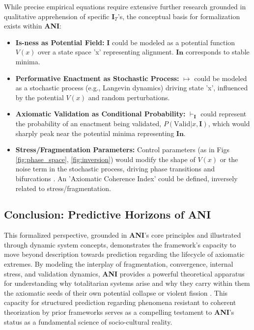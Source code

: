 \documentclass{article}
\newcommand{\ANI}{\textbf{ANI}}             %
\newcommand{\Isness}{\mathbf{I}}            %
\newcommand{\Inness}{\mathbf{In}}           %
\newcommand{\enactment}{\ensuremath{\mapsto}} %
\newcommand{\validates}[1]{\ensuremath{\vdash_{#1}}} %
\begin{document}
While precise empirical equations require extensive further research grounded in qualitative apprehension of specific $\Isness_T$'s, the conceptual basis for formalization exists within \ANI{}:
\begin{itemize}
    \item \textbf{Is-ness as Potential Field:} $\Isness$ could be modeled as a potential function $V(x)$ over a state space 'x' representing alignment. $\Inness$ corresponds to stable minima.
    \item \textbf{Performative Enactment as Stochastic Process:} $\enactment$ could be modeled as a stochastic process (e.g., Langevin dynamics) driving state 'x', influenced by the potential $V(x)$ and random perturbations.
    \item \textbf{Axiomatic Validation as Conditional Probability:} $\validates{\Isness}$ could represent the probability of an enactment being validated, $P(\text{Valid} | x, \Isness)$, which would sharply peak near the potential minima representing $\Inness$.
    \item \textbf{Stress/Fragmentation Parameters:} Control parameters (as in Figs \ref{fig:phase_space}, \ref{fig:inversion}) would modify the shape of $V(x)$ or the noise term in the stochastic process, driving phase transitions and bifurcations \citep{Luhmann1995}. An 'Axiomatic Coherence Index' could be defined, inversely related to stress/fragmentation.
\end{itemize}

\subsection{Conclusion: Predictive Horizons of ANI}

This formalized perspective, grounded in \ANI{}'s core principles and illustrated through dynamic system concepts, demonstrates the framework's capacity to move beyond description towards prediction regarding the lifecycle of axiomatic extremes. By modeling the interplay of fragmentation, convergence, internal stress, and validation dynamics, \ANI{} provides a powerful theoretical apparatus for understanding why totalitarian systems arise \citep{Arendt1951} and why they carry within them the axiomatic seeds of their own potential collapse or violent fission \citep{Hofstadter1979}. This capacity for structured prediction regarding phenomena resistant to coherent theorization by prior frameworks serves as a compelling testament to \ANI{}'s status as a fundamental science of socio-cultural reality.


\end{document}
